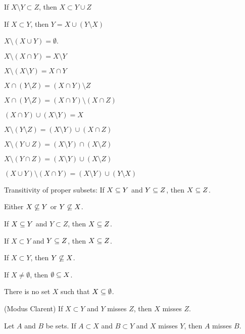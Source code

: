 \documentclass{article}
\begin{document}
\begin{thm}
\item\label{xboole1:44} If $X\setminus Y\subset Z$, then $X \subset Y \cup Z$
\item\label{xboole1:45} If $X \subset Y$, then $Y = X \cup (Y \setminus X)$
\item\label{xboole1:46} $X \setminus (X \cup Y) = \emptyset$.
\item\label{xboole1:47} $X \setminus (X \cap Y) = X \setminus Y$
\item\label{xboole1:48} $X \setminus (X \setminus Y) = X \cap Y$
\item\label{xboole1:49} $X \cap (Y \setminus Z) = (X \cap Y) \setminus Z$
\item\label{xboole1:50} $X \cap (Y \setminus Z) = (X \cap Y) \setminus (X \cap Z)$
\item\label{xboole1:51} $(X \cap Y) \cup (X \setminus Y) = X$
\item\label{xboole1:52} $X \setminus (Y \setminus Z) = (X \setminus Y) \cup (X \cap Z)$
\item\label{xboole1:53} $X \setminus (Y \cup Z) = (X \setminus Y) \cap (X \setminus Z)$
\item\label{xboole1:54} $X \setminus (Y \cap Z) = (X \setminus Y) \cup (X \setminus Z)$
\item\label{xboole1:55} $(X \cup Y) \setminus (X \cap Y) = (X \setminus Y) \cup (Y \setminus X)$
\item\label{xboole1:56} Transitivity of proper subsets: If
  $X\properSubset Y$ and $Y\properSubset Z$, then $X\properSubset Z$.
\item\label{xboole1:57} Either $X\not\properSubset Y$ or
  $Y\not\properSubset X$.
\item\label{xboole1:58} If
  $X\properSubset Y$ and $Y\subset Z$, then $X\properSubset Z$.
\item\label{xboole1:59}  If
  $X\subset Y$ and $Y\properSubset Z$, then $X\properSubset Z$.
\item\label{xboole1:60} If $X\subset Y$, then $Y\not\properSubset X$.
\item\label{xboole1:61} If $X\neq\emptyset$, then
  $\emptyset\properSubset X$.
\item\label{xboole1:62} There is no set $X$ such that $X\properSubset\emptyset$.
\item\label{xboole1:63} (Modus Clarent) If $X\subset Y$ and $Y$ misses
  $Z$, then $X$ misses $Z$.
\item\label{xboole1:64} Let $A$ and $B$ be sets. If $A\subset X$ and
  $B\subset Y$ and $X$ misses $Y$, then $A$ misses $B$.

\end{thm}
\end{document}
